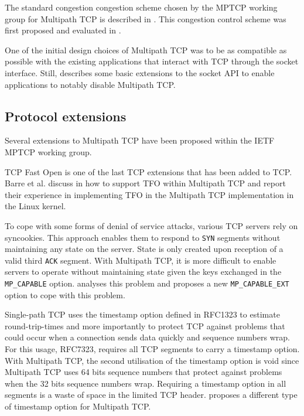 The standard congestion congestion scheme chosen by the MPTCP working group for Multipath TCP is described in \cite{rfc6356}. This congestion control scheme was first proposed and evaluated in \cite{Wischik_Design:2011}.

One of the initial design choices of Multipath TCP was to be as compatible as possible with the existing applications that interact with TCP through the socket interface. Still, \cite{rfc6897} describes some basic extensions to the socket API to enable applications to notably disable Multipath TCP.  


\subsection{Protocol extensions}

Several extensions to Multipath TCP have been proposed within the IETF MPTCP working group. 

TCP Fast Open is one of the last TCP extensions that has been added to TCP. Barre et al. discuss
in \cite{draft-barre-mptcp-tfo} how to support TFO within Multipath TCP and report their experience in implementing TFO in the Multipath TCP implementation in the Linux kernel.

To cope with some forms of denial of service attacks, various TCP servers rely on syncookies. This approach enables them to respond to \texttt{SYN} segments without maintaining any state on the server. State is only created upon reception of a valid third \texttt{ACK} segment. With Multipath TCP, it is more difficult to enable servers to operate without maintaining state given the keys exchanged in the \texttt{MP\_CAPABLE} option. \cite{draft-paasch-mptcp-syncookies-00} analyses this problem and proposes a new \texttt{MP\_CAPABLE\_EXT} option to cope with this problem.

Single-path TCP uses the timestamp option defined in RFC1323 to estimate round-trip-times and more importantly to protect TCP against problems that could occur when a connection sends data
quickly and sequence numbers wrap. For this usage, RFC7323, requires all TCP segments to carry a timestamp option. With
Multipath TCP, the second utilisation of the timestamp option is
void since Multipath TCP uses 64 bits sequence numbers that protect against problems when the 32 bits sequence numbers wrap. Requiring a timestamp option in all segments is a waste of space
in the limited TCP header. \cite{draft-bonaventure-mptcp-timestamp} proposes a different
type of timestamp option for Multipath TCP.

